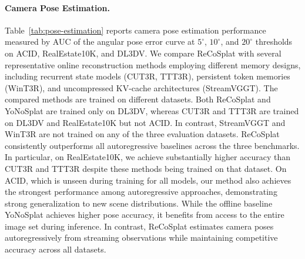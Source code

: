 \documentclass[runningheads]{llncs}
\begin{document}
\begin{table}[tb]
{\begin{tabular}{@{} lcc 
        p{0.5em}
        *{3}{c} p{0.5em}
        *{3}{c} p{0.5em}
        *{3}{c} p{0.5em}
        *{3}{c} @{}}
        \bottomrule
    \end{tabular}
}
\end{table}

\vspace{-2mm} \paragraph{\textbf{Camera Pose Estimation.}}

Table~\ref{tab:pose-estimation} reports camera pose estimation performance measured by AUC of the angular pose error curve at $5^\circ$, $10^\circ$, and $20^\circ$ thresholds on ACID, RealEstate10K, and DL3DV. 
We compare ReCoSplat with several representative online reconstruction methods employing different memory designs, including recurrent state models (CUT3R, TTT3R), persistent token memories (WinT3R), and uncompressed KV-cache architectures (StreamVGGT). 
The compared methods are trained on different datasets. Both ReCoSplat and YoNoSplat are trained only on DL3DV, whereas CUT3R and TTT3R are trained on DL3DV and RealEstate10K but not ACID. 
In contrast, StreamVGGT and WinT3R are not trained on any of the three evaluation datasets.
ReCoSplat consistently outperforms all autoregressive baselines across the three benchmarks. 
In particular, on RealEstate10K, we achieve substantially higher accuracy than CUT3R and TTT3R despite these methods being trained on that dataset. 
On ACID, which is unseen during training for all models, our method also achieves the strongest performance among autoregressive approaches, demonstrating strong generalization to new scene distributions.
While the offline baseline YoNoSplat achieves higher pose accuracy, it benefits from access to the entire image set during inference. 
In contrast, ReCoSplat estimates camera poses autoregressively from streaming observations while maintaining competitive accuracy across all datasets. 
\end{document}

